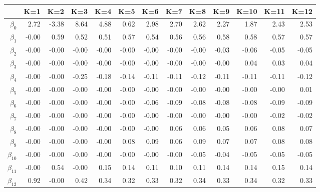 \begin{table}[ht]
\centering
\begin{tabular}{rrrrrrrrrrrrr}
  \hline
 & K=1 & K=2 & K=3 & K=4 & K=5 & K=6 & K=7 & K=8 & K=9 & K=10 & K=11 & K=12 \\ 
  \hline
$\beta_{0}$ & 2.72 & -3.38 & 8.64 & 4.88 & 0.62 & 2.98 & 2.70 & 2.62 & 2.27 & 1.87 & 2.43 & 2.53 \\ 
  $\beta_{1}$ & -0.00 & 0.59 & 0.52 & 0.51 & 0.57 & 0.54 & 0.56 & 0.56 & 0.58 & 0.58 & 0.57 & 0.57 \\ 
  $\beta_{2}$ & -0.00 & -0.00 & -0.00 & -0.00 & -0.00 & -0.00 & -0.00 & -0.00 & -0.03 & -0.06 & -0.05 & -0.05 \\ 
  $\beta_{3}$ & -0.00 & -0.00 & -0.00 & -0.00 & -0.00 & -0.00 & -0.00 & -0.00 & -0.00 & 0.04 & 0.03 & 0.04 \\ 
  $\beta_{4}$ & -0.00 & -0.00 & -0.25 & -0.18 & -0.14 & -0.11 & -0.11 & -0.12 & -0.11 & -0.11 & -0.11 & -0.12 \\ 
  $\beta_{5}$ & -0.00 & -0.00 & -0.00 & -0.00 & -0.00 & -0.00 & -0.00 & -0.00 & -0.00 & -0.00 & -0.00 & 0.01 \\ 
  $\beta_{6}$ & -0.00 & -0.00 & -0.00 & -0.00 & -0.00 & -0.06 & -0.09 & -0.08 & -0.08 & -0.08 & -0.09 & -0.09 \\ 
  $\beta_{7}$ & -0.00 & -0.00 & -0.00 & -0.00 & -0.00 & -0.00 & -0.00 & -0.00 & -0.00 & -0.00 & -0.02 & -0.02 \\ 
  $\beta_{8}$ & -0.00 & -0.00 & -0.00 & -0.00 & -0.00 & -0.00 & 0.06 & 0.06 & 0.05 & 0.06 & 0.08 & 0.07 \\ 
  $\beta_{9}$ & -0.00 & -0.00 & -0.00 & -0.00 & 0.08 & 0.09 & 0.06 & 0.09 & 0.07 & 0.07 & 0.08 & 0.08 \\ 
  $\beta_{10}$ & -0.00 & -0.00 & -0.00 & -0.00 & -0.00 & -0.00 & -0.00 & -0.05 & -0.04 & -0.05 & -0.05 & -0.05 \\ 
  $\beta_{11}$ & -0.00 & 0.54 & -0.00 & 0.15 & 0.14 & 0.11 & 0.10 & 0.11 & 0.14 & 0.14 & 0.15 & 0.14 \\ 
  $\beta_{12}$ & 0.92 & -0.00 & 0.42 & 0.34 & 0.32 & 0.33 & 0.32 & 0.34 & 0.33 & 0.34 & 0.32 & 0.33 \\ 
   \hline
\end{tabular}
\end{table}
